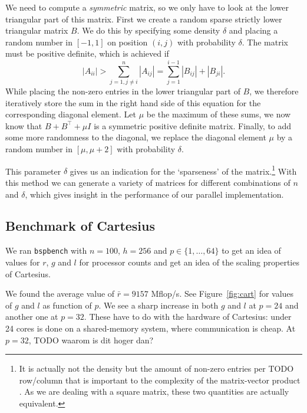\documentclass[11pt]{amsart}
\theoremstyle{definition}
\begin{document}
We need to compute a \emph{symmetric} matrix, so we only have to look at the lower triangular part of this matrix. First we create a 
random sparse strictly lower triangular matrix $B$. We do this by specifying some
density $\delta$ and placing a random number in $[-1,1]$ on position $(i,j)$ with probability $\delta$. The matrix
must be positive definite, which is achieved \cite[Ex.~24.2]{trefbau} if
\[
  |A_{ii}| > \sum_{j=1, j\ne i}^n |A_{ij}|= \sum_{j=1}^{i-1} |B_{ij}| + |B_{ji}|.
\]
While placing the non-zero entries in the lower triangular part of $B$, we therefore iteratively store the sum in the right hand side of this equation for the
corresponding diagonal element. Let $\mu$ be the maximum of these sums, we now know that $B + B^\top + \mu I$ is a symmetric
positive definite matrix. Finally, to add some more randomness to the diagonal, we replace the diagonal element $\mu$ by a random number in $[\mu, \mu + 2]$ with probability $\delta$.

This parameter $\delta$ gives us an indication for the `sparseness' of the matrix.\footnote{It is actually not the density but the amount of non-zero entries per TODO row/column that is important to the complexity of the matrix-vector product \cite[p.~178]{biss04}. As we are dealing with a square matrix, these two quantities are actually equivalent.} With this method we can generate a variety of matrices
for different combinations of $n$ and $\delta$, which gives insight in the performance of our parallel implementation.

\subsection{Benchmark of Cartesius}
\label{sec:cart}
We ran \texttt{bspbench} with $n=100$, $h=256$ and $p \in \{1, \ldots, 64\}$ to get an idea of values for $r$, $g$ and $l$ for processor counts and get an idea of the scaling properties of Cartesius.

We found the average value of $\bar r = 9157$ Mflop/s. See Figure~\ref{fig:cart} for values of $g$ and $l$ as function of $p$. We see a sharp increase in both $g$ and $l$ at $p=24$ and another one at $p=32$. These have to do with the hardware of Cartesius: under 24 cores is done on a shared-memory system, where communication is cheap. At $p=32$, TODO waarom is dit hoger dan?
\end{document}
